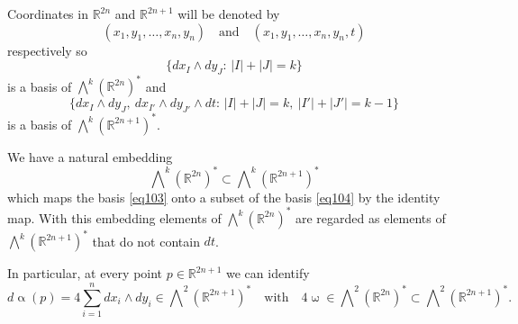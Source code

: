 \documentclass[intlimits,12pt,reqno]{amsart}
\newcommand{\R}{\mathbb R}
\numberwithin{equation}{section}
\theoremstyle{definition}
\newcommand{\Ep}{\bigwedge\nolimits}
\begin{document}
Coordinates in $\R^{2n}$ and $\R^{2n+1}$ will be denoted by
$$
(x_1,y_1,\ldots,x_n,y_n)
\quad
\text{and}
\quad
(x_1,y_1,\ldots,x_n,y_n,t)
$$
respectively so
\begin{equation}
\label{eq103}
\{dx_I\wedge dy_J:\, |I|+|J|=k\}
\end{equation}
is a basis of $\Ep^k(\R^{2n})^*$ and
\begin{equation}
\label{eq104}
\{dx_I\wedge dy_J,\ dx_{I'}\wedge dy_{J'}\wedge dt:\, |I|+|J|=k,\ |I'|+|J'|=k-1\}
\end{equation}
is a basis of $\Ep^k(\R^{2n+1})^*$.

We have a natural embedding 
\begin{equation}
\label{eq105}
\Ep^k(\R^{2n})^*\subset\Ep^{k}(\R^{2n+1})^*
\end{equation} 
which maps the basis \eqref{eq103} onto a subset of the basis \eqref{eq104} by the identity map. With this embedding elements of $\Ep^k(\R^{2n})^*$ are regarded as elements of $\Ep^{k}(\R^{2n+1})^*$ that do not contain $dt$.

In particular, at every point $p\in\R^{2n+1}$ we can identify
$$
d\upalpha(p)=4\sum_{i=1}^n dx_i\wedge dy_i\in \Ep^2(\R^{2n+1})^*
\quad
\text{with}
\quad
4\upomega\in \Ep^2(\R^{2n})^*\subset \Ep^2(\R^{2n+1})^*.
$$
\end{document}

